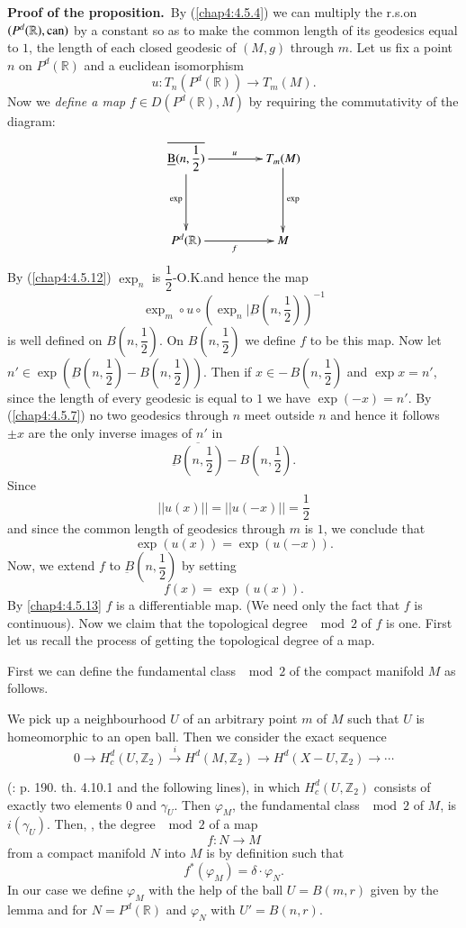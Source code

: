 \noindent
{\bf Proof of the proposition.}~By (\ref{chap4:4.5.4}) we can multiply the
r.s.\@ on $(P^{d}(\mathbb{R}),\unskip\break\can)$ by a constant so as to make the
common length of its geodesics equal to $1$, the length of each closed
geodesic of $(M,g)$ through \pageoriginale $m$. Let us fix a point $n$
on $P^{d}(\mathbb{R})$ and a euclidean isomorphism
$$
u:T_{n}(P^{d}(\mathbb{R}))\to T_{m}(M).
$$
Now we {\em define a map} $f\in D(P^{d}(\mathbb{R}),M)$ by requiring
the commutativity of the diagram:
\[
\xymatrix@=1.5cm{
\overline{\underbar{B}(n,\dfrac{1}{2})}\ar[d]_{\exp}\ar[r]^{u} &
T_{m}(M)\ar[d]^{\exp}\\
P^{d}(\mathbb{R})\ar[r]_{f} & M
}
\]
By (\ref{chap4:4.5.12}) $\exp_{n}$ is $\dfrac{1}{2}$-O.K.\@ and hence
the map
$$
\exp_{m}\circ u\circ (\exp_{n}|\underbar{B}(n,\dfrac{1}{2}))^{-1}
$$
is well defined on $B(n,\dfrac{1}{2})$. On $B(n,\dfrac{1}{2})$ we
define $f$ to be this map. Now let $n'\in
\exp(\underbar{B}(n,\dfrac{1}{2})-B(n,\dfrac{1}{2}))$. Then if
$x\in - \,B(n,\dfrac{1}{2})$ and $\exp x=n'$, since the length
of every geodesic is equal to $1$ we have $\exp(-x)=n'$. By
(\ref{chap4:4.5.7}) no two geodesics through $n$ meet outside $n$ and
hence it follows $\pm x$ are the only inverse images of $n'$ in 
$$
\overline{\underbar{B}(n,\dfrac{1}{2})}-B(n,\dfrac{1}{2}).
$$
Since\pageoriginale
$$
||u(x)||=||u(-x)||=\dfrac{1}{2}
$$
and since the common length of geodesics through $m$ is $1$, we
conclude that
$$
\exp(u(x))=\exp(u(-x)).
$$
Now, we extend $f$ to $\underbar{B}(n,\dfrac{1}{2})$ by setting
$$
f(x)=\exp(u(x)).
$$
By \eqref{chap4:4.5.13} $f$ is a differentiable map. (We need only the fact
that $f$ is continuous). Now we claim that the topological degree
$\mod 2$ of $f$ is one. First let us recall the process of getting the
topological degree of a map.

First we can define the fundamental class $\mod 2$ of the compact
manifold $M$ as follows.

We pick up a neighbourhood $U$ of an arbitrary point $m$ of $M$ such
that $U$ is homeomorphic to an open ball. Then we consider the exact
sequence
$$
0\to
H^{d}_{c}(U,\mathbb{Z}_{2})\xrightarrow{i}H^{d}(M,\mathbb{Z}_{2})\to
H^{d}(X-U,\mathbb{Z}_{2})\to\cdots 
$$

(\cite{12}: p. 190. th. 4.10.1 and the following lines), in which
$H^{d}_{c}(U,\mathbb{Z}_{2})$ consists of exactly two elements $0$ and
$\gamma_{U}$. Then $\varphi_{M}$, the fundamental class $\mod 2$ of
$M$, is $i(\gamma_{U})$. Then, \quad , the degree $\mod 2$ of a map
$$
f:N\to M
$$
from a compact manifold $N$ into $M$ is by definition such that
$$
f^{\ast}(\varphi_{M})=\delta\cdot \varphi_{N}.
$$
In \pageoriginale our case we define $\varphi_{M}$ with the help of the
ball $U=B(m,r)$ given by the lemma and for $N=P^{d}(\mathbb{R})$ and
$\varphi_{N}$ with $U'=B(n,r)$.

